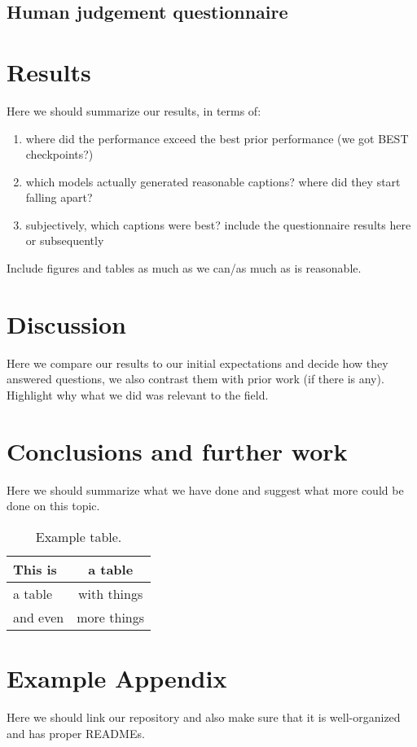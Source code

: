 \documentclass[11pt]{article}
\begin{document}
\subsection{Human judgement questionnaire}

\section{Results}

Here we should summarize our results, in terms of:
\begin{enumerate}
    \item where did the performance exceed the best prior performance (we got BEST checkpoints?)
    \item which models actually generated reasonable captions? where did they start falling apart?
    \item subjectively, which captions were best? include the questionnaire results here or subsequently
\end{enumerate}
Include figures and tables as much as we can/as much as is reasonable.

\section{Discussion}

Here we compare our results to our initial expectations and decide how they answered questions, we also contrast them with prior work (if there is any). Highlight why what we did was relevant to the field.

\section{Conclusions and further work}

Here we should summarize what we have done and suggest what more could be done on this topic.

\begin{table}
\centering
\begin{tabular}{lc}
\hline
\textbf{This is} & \textbf{a table}\\
\hline
a table & with things \\
and even & more things  \\\hline
\end{tabular}
\caption{Example table.}
\label{tab:accents}
\end{table}



\appendix

\section{Example Appendix}
\label{sec:appendix}

Here we should link our repository and also make sure that it is well-organized and has proper READMEs.
\end{document}
